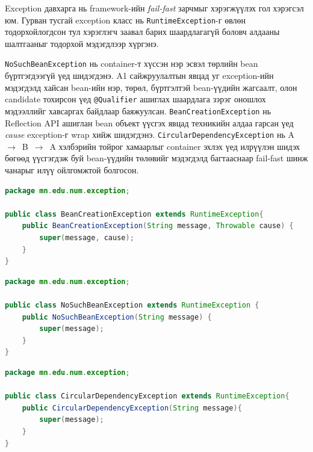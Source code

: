 Exception давхарга нь framework-ийн \textit{fail-fast} зарчмыг
хэрэгжүүлэх гол хэрэгсэл юм. Гурван тусгай exception класс нь
\texttt{RuntimeException}-г өвлөн тодорхойлогдсон тул хэрэглэгч
заавал барих шаардлагагүй боловч алдааны шалтгааныг тодорхой
мэдэгдлээр хүргэнэ.

\texttt{NoSuchBeanException} нь container-т хүссэн нэр эсвэл төрлийн
bean бүртгэгдээгүй үед шидэгдэнэ. A1 сайжруулалтын явцад уг exception-ийн
мэдэгдэлд хайсан bean-ийн нэр, төрөл, бүртгэлтэй bean-үүдийн жагсаалт,
олон candidate тохирсон үед \texttt{@Qualifier} ашиглах шаардлага зэрэг
оношлох мэдээллийг хавсаргах байдлаар баяжуулсан. \texttt{BeanCreationException}
нь Reflection API ашиглан bean объект үүсгэх явцад техникийн алдаа гарсан
үед \textit{cause} exception-г wrap хийж шидэгдэнэ. \texttt{CircularDependencyException}
нь A~$\rightarrow$~B~$\rightarrow$~A хэлбэрийн тойрог хамаарлыг container
эхлэх үед илрүүлэн шидэх бөгөөд үүсгэгдэж буй bean-үүдийн төлөвийг
мэдэгдэлд багтааснаар fail-fast шинж чанарыг илүү ойлгомжтой болгосон.

\begin{lstlisting}[language=Java,
    caption={BeanCreationException классын хэрэгжүүлэлт},
    label={lst:beancreation-exception}]
package mn.edu.num.exception;

public class BeanCreationException extends RuntimeException{
    public BeanCreationException(String message, Throwable cause) {
        super(message, cause);
    }
}

\end{lstlisting}


\begin{lstlisting}[language=Java,
    caption={NoSuchBeanException классын хэрэгжүүлэлт},
    label={lst:nosuchbean-exception}]
package mn.edu.num.exception;

public class NoSuchBeanException extends RuntimeException {
    public NoSuchBeanException(String message) {
        super(message);
    }
}

\end{lstlisting}


\begin{lstlisting}[language=Java,
    caption={CircularDependencyException классын хэрэгжүүлэлт},
    label={lst:circulardependency-exception}]
package mn.edu.num.exception;

public class CircularDependencyException extends RuntimeException{
    public CircularDependencyException(String message){
        super(message);
    }
}


\end{lstlisting}
